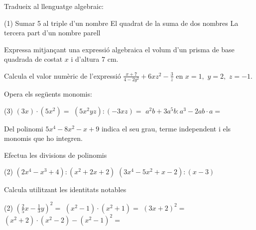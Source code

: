  
\newpage
\begin{autoaval}{49}

\begin{mylist}

\exer[2]  Tradueix al llenguatge algebraic:  

\begin{tasks}(1)
	\task  Sumar 5 al triple d'un nombre  
	\task  El quadrat de la suma de dos nombres   
	\task  La tercera part d'un nombre parell 
\end{tasks}
\answers{[$3x+5$, $(x+y)^2$, $\frac{2n}{3}$]}


\exer[2]  Expressa mitjançant una expressió algebraica el volum d'un prisma de base quadrada de costat $x$ i d'altura 7 cm.

\exer[2] Calcula el valor numèric de l'expressió $\frac{x+7}{4-2y^{2} } +6xz^{2} -\frac{3}{z} $ en $x=1,\, \, y=2,\, \, z=-1$.  
\begin{comment}
\begin{tasks}(4)
\task  $-11$   
\task  $7$   
\task  $1$  
\task  $-5$
\end{tasks}
\end{comment}



\exer[2]  Opera els següents monomis:
\begin{tasks}(3)
   \task $(3x)\cdot (5x^{2} )=$  
	\task  $(5x^{2} yz):(-3xz)=$  
	\task  $a^{2} b+3a^{5} b:a^{3} -2ab\cdot a=$
\end{tasks}
\answers{[$15x^3$, $-\frac{5}{3}xy$, $2a^2 b$]}

\exer[2]  Del polinomi $5x^{4} -8x^{2} -x+9$ indica el seu grau, terme independent i els monomis que ho integren. 

\exer[2]  Efectua les divisions de polinomis 

\begin{tasks}(2)
	\task  $(2x^{4} -x^{3} +4):(x^{2} +2x+2)$  
	\task $(3x^{4} -5x^{2} +x-2):(x-3)$
\end{tasks}
\answers[cols=1]{[$Q=2x^2-5x+6$; $R=-2x-8$, $Q=3x^3+9x^2+22x+67$; $R=199$]}


\exer[2]  Calcula utilitzant les identitats notables

\begin{tasks}(2)
	\task  $\left(\frac{2}{5} x-\frac{1}{3} y\right)^{2} =$  
	\task  $\left(x^{2} -1\right)\cdot \left(x^{2} +1\right)=$  
	\task  $\left(3x+2\right)^{2} =$ 
	\task   $\left(x^{2} +2\right)\cdot \left(x^{2} -2\right)-\left(x^{2} -1\right)^{2} =$
\end{tasks}


\end{mylist}
\end{autoaval}

